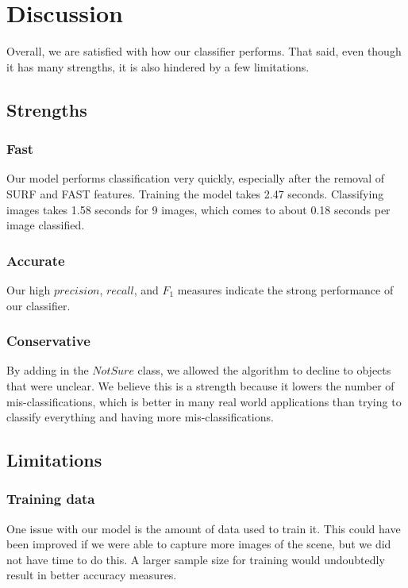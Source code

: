 \documentclass[12pt]{article}
\begin{document}
\section{Discussion}

Overall, we are satisfied with how our classifier performs. That said, even though it has many strengths, it is also hindered by a few limitations.

\subsection{Strengths}

\subsubsection{Fast}

Our model performs classification very quickly, especially after the removal of SURF and FAST features. Training the model takes 2.47 seconds. Classifying images takes 1.58 seconds for 9 images, which comes to about 0.18 seconds per image classified.

\subsubsection{Accurate}

Our high $precision$, $recall$, and $F_1$ measures indicate the strong performance of our classifier. 

\subsubsection{Conservative}

By adding in the $NotSure$ class, we allowed the algorithm to decline to objects that were unclear. We believe this is a strength because it lowers the number of mis-classifications, which is better in many real world applications than trying to classify everything and having more mis-classifications.

\subsection{Limitations}

\subsubsection{Training data}

One issue with our model is the amount of data used to train it. This could have been improved if we were able to capture more images of the scene, but we did not have time to do this. A larger sample size for training would undoubtedly result in better accuracy measures.
\end{document}
